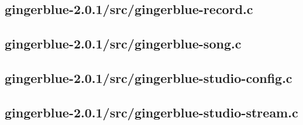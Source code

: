 \documentclass[UKenglish]{ifimaster}  %
\begin{document}
\begin{scriptsize}
  
  
  
\end{scriptsize}

\subsection{gingerblue-2.0.1/src/gingerblue-record.c}

\begin{scriptsize}
  
  
  
\end{scriptsize}

\subsection{gingerblue-2.0.1/src/gingerblue-song.c}

\begin{scriptsize}
  
  
  
\end{scriptsize}

\subsection{gingerblue-2.0.1/src/gingerblue-studio-config.c}

\begin{scriptsize}
  
  
  
\end{scriptsize}

\subsection{gingerblue-2.0.1/src/gingerblue-studio-stream.c}

\begin{scriptsize}
  
  
  
\end{scriptsize}
\end{document}
